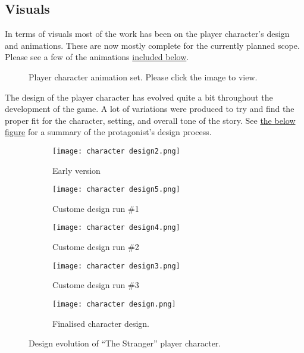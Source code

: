 \clearpage
\subsection{Visuals}
In terms of visuals most of the work has been on the player character's design and animations. These are now mostly complete for the currently planned scope. Please see a few of the animations \hyperref[fig:animations]{included below}.

\begin{figure}[h]
  \centering
  \caption{Player character animation set. Please click the image to view.}
  \label{fig:animations}
\end{figure}

The design of the player character has evolved quite a bit throughout the development of the game. A lot of variations were produced to try and find the proper fit for the character, setting, and overall tone of the story. See \hyperref[fig:designs]{the below figure} for a summary of the protagonist's design process.
\clearpage

\begin{figure}
  \centering
  \begin{subfigure}[b]{0.45\textwidth}
    \texttt{[image: character design2.png]}
    \caption{Early version}
  \end{subfigure}
  \begin{subfigure}[b]{0.45\textwidth}
    \texttt{[image: character design5.png]}
    \caption{Custome design run \#1}
  \end{subfigure}
  \begin{subfigure}[b]{0.45\textwidth}
    \texttt{[image: character design4.png]}
    \caption{Custome design run \#2}
  \end{subfigure}
  \begin{subfigure}[b]{0.45\textwidth}
    \texttt{[image: character design3.png]}
    \caption{Custome design run \#3}
  \end{subfigure}
  \begin{subfigure}[b]{0.7\textwidth}
    \texttt{[image: character design.png]}
    \caption{Finalised character design.}
  \end{subfigure}
  \label{fig:designs}
  \caption{Design evolution of ``The Stranger'' player character.}
\end{figure}

